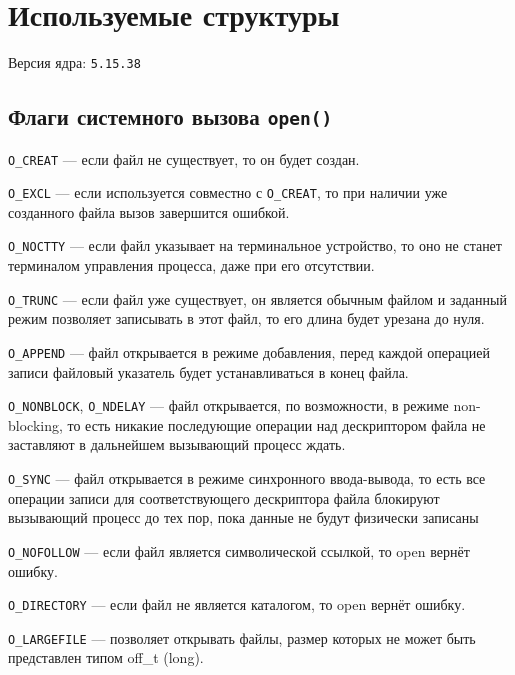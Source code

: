 \chapter{Используемые структуры}

Версия ядра: \texttt{5.15.38}




\clearpage
{}



\clearpage
\section*{Флаги системного вызова \texttt{open()}}

\texttt{O\_CREAT} --- если файл не существует, то он будет создан.

\texttt{O\_EXCL} --- если используется совместно с \texttt{O\_CREAT}, то при
наличии уже созданного файла вызов завершится ошибкой.

\texttt{O\_NOCTTY} --- если файл указывает на терминальное устройство, то оно не
станет терминалом управления процесса, даже при его отсутствии.

\texttt{O\_TRUNC} --- если файл уже существует, он является обычным файлом и
заданный режим позволяет записывать в этот файл, то его длина будет урезана до
нуля.

\texttt{O\_APPEND} --- файл открывается в режиме добавления, перед каждой
операцией записи файловый указатель будет устанавливаться в конец файла.

\texttt{O\_NONBLOCK}, \texttt{O\_NDELAY} --- файл открывается, по возможности, в
режиме non-blocking, то есть никакие последующие операции над дескриптором файла
не заставляют в дальнейшем вызывающий процесс ждать.

\texttt{O\_SYNC} ---  файл открывается в режиме синхронного ввода-вывода, то
есть все операции записи для соответствующего дескриптора файла блокируют
вызывающий процесс до тех пор, пока данные не будут физически записаны

\texttt{O\_NOFOLLOW} --- если файл является символической ссылкой, то open
вернёт ошибку.

\texttt{O\_DIRECTORY} --- если файл не является каталогом, то open вернёт
ошибку.

\texttt{O\_LARGEFILE} --- позволяет открывать файлы, размер которых не может
быть представлен типом off\_t (long).

